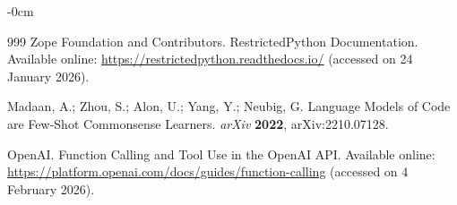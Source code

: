 \documentclass[journal,article,submit,pdftex,moreauthors]{Definitions/mdpi}
\begin{document}
\begin{adjustwidth}{-\extralength}{0cm}
\begin{thebibliography}{999}
Zope Foundation and Contributors. RestrictedPython Documentation. Available online: \url{https://restrictedpython.readthedocs.io/} (accessed on 24 January 2026).

Madaan, A.; Zhou, S.; Alon, U.; Yang, Y.; Neubig, G. Language Models of Code are Few-Shot Commonsense Learners. \textit{arXiv} \textbf{2022}, arXiv:2210.07128.

OpenAI. Function Calling and Tool Use in the OpenAI API. Available online: \url{https://platform.openai.com/docs/guides/function-calling} (accessed on 4 February 2026).
\end{thebibliography}

%


\PublishersNote{}
\end{adjustwidth}
\end{document}
